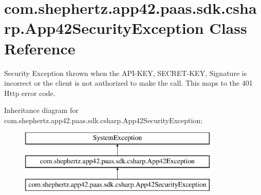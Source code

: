 \hypertarget{classcom_1_1shephertz_1_1app42_1_1paas_1_1sdk_1_1csharp_1_1_app42_security_exception}{\section{com.\+shephertz.\+app42.\+paas.\+sdk.\+csharp.\+App42\+Security\+Exception Class Reference}
\label{classcom_1_1shephertz_1_1app42_1_1paas_1_1sdk_1_1csharp_1_1_app42_security_exception}
}


Security Exception thrown when the A\+P\+I-\/\+K\+E\+Y, S\+E\+C\+R\+E\+T-\/\+K\+E\+Y, Signature is incorrect or the client is not authorized to make the call. This maps to the 401 Http error code.  


Inheritance diagram for com.\+shephertz.\+app42.\+paas.\+sdk.\+csharp.\+App42\+Security\+Exception\+:\begin{figure}[H]
\begin{center}
\leavevmode
\includegraphics[height=3.000000cm]{classcom_1_1shephertz_1_1app42_1_1paas_1_1sdk_1_1csharp_1_1_app42_security_exception}
\end{center}
\end{figure}
